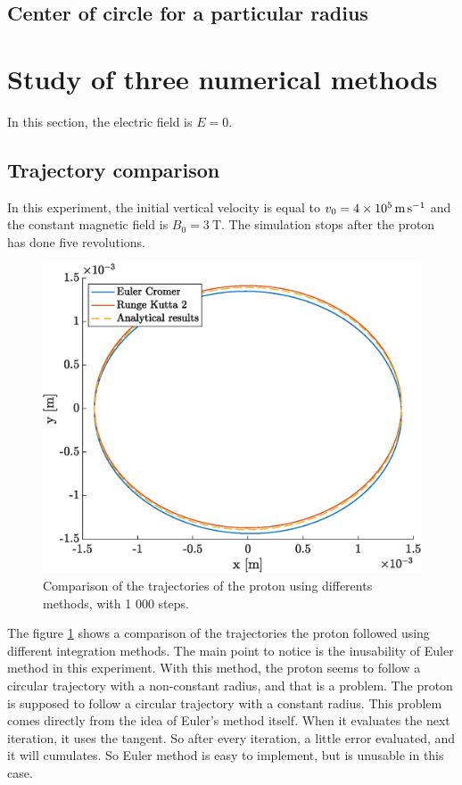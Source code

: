 \documentclass[a4paper,12pt,twoside]{article}
\begin{document}
\subsection{Center of circle for a particular radius}

\section{Study of three numerical methods}
In this section, the electric field is $E = 0$.
\subsection{Trajectory comparison}
In this experiment, the initial vertical velocity is equal to $v_0 = \SI{4d5}{\meter\per\second}$ and the constant magnetic field is $B_0 = \SI{3}{\tesla}$.
The simulation stops after the proton has done five revolutions.\\
\begin{figure}[h]
	\centering
	\includegraphics[width=0.5\linewidth]{graphs/ex2_ii_traj.eps}
	\caption{Comparison of the trajectories of the proton using differents methods, with 1 000 steps.}
	\label{fig:ex2-ii-traj}
\end{figure}
The figure \ref{fig:ex2-ii-traj} shows a comparison of the trajectories the proton followed using different integration methods.
The main point to notice is the inusability of Euler method in this experiment.
With this method, the proton seems to follow a circular trajectory with a non-constant radius, and that is a problem.
The proton is supposed to follow a circular trajectory with a constant radius.
This problem comes directly from the idea of Euler's method itself.
When it evaluates the next iteration, it uses  the tangent.%
So after every iteration, a little error evaluated, and it will cumulates.
So Euler method is easy to implement, but is unusable in this case.\\
\end{document}
